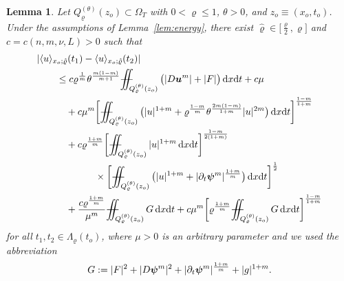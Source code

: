 \documentclass[a4paper, 10pt, american]{amsart}
\newtheorem{lemma}[theorem]{Lemma}
\numberwithin{theorem}{section}
\numberwithin{equation}{section}
\newcommand{\dxdt}{\,\mathrm{d}x\mathrm{d}t}
\renewcommand{\rho}{\varrho}
\newcommand{\power}[2]{\bm{#1^{\mbox{\unboldmath{\scriptsize$#2$}}}}}
\def\Xiint#1{\mathchoice
    {\XXiint\displaystyle\textstyle{#1}}%
    {\XXiint\textstyle\scriptstyle{#1}}%
    {\XXiint\scriptstyle\scriptscriptstyle{#1}}%
    {\XXiint\scriptscriptstyle\scriptscriptstyle{#1}}%
    \!\iint}
\def\XXiint#1#2#3{\setbox0=\hbox{$#1{#2#3}{\iint}$}
    \vcenter{\hbox{$#2#3$}}\kern-0.5\wd0}
\def\biint{\Xiint{-\!-}}
\def\<{\langle}
\def\>{\rangle}
\begin{document}
\begin{lemma}\label{lem:time-diff}
  Let $Q_{\rho}^{(\theta)}(z_o)\subset\Omega_T$ with 
$0<\rho\le 1$, $\theta>0$, and $z_o\equiv(x_o,t_o)$. 
Under the assumptions of Lemma~\ref{lem:energy}, there exist $\hat{\rho}\in\big[\frac\rho2,\rho\big]$ and $c=c(n,m,\nu,L)>0$ such that
\begin{align}\label{gluing}\nonumber
&|\<u\>_{x_o;\hat{\rho}}(t_1)-\<u\>_{x_o;\hat{\rho}}(t_2)|\\\nonumber
&\qquad\le
c\rho^{\frac1m}\theta^{\frac{m(1-m)}{m+1}}\biint_{Q_\rho^{(\theta)}(z_o)}
\big(|D\power um|+|F|\big)\dxdt+c\mu \\\nonumber
&\qquad\quad+
c\mu^m\bigg[\biint_{Q_\rho^{(\theta)}(z_o)} \big(|u|^{1+m} 
+
\rho^{\frac{1-m}m}\theta^{\frac{2m(1-m)}{1+m}} |u|^{2m}\big)
\dxdt\bigg]^{\frac{1-m}{1+m}}\\\nonumber
&\qquad\quad+
c\rho^{\frac{1+m}m}\bigg[\biint_{Q_\rho^{(\theta)}(z_o)} |u|^{1+m} \dxdt \bigg]^{\frac{1-m}{2(1+m)}} \\\nonumber
&\qquad\qquad\qquad\times
\bigg[\biint_{Q_\rho^{(\theta)}(z_o)}\big(|u|^{1+m}+ |\partial_t \power \psi m|^{\frac{1+m}m}\big) \dxdt\bigg]^{\frac12} \\
&\qquad\quad+
  \frac{c\rho^{\frac{1+m}m}}{\mu^m}
  \biint_{Q_\rho^{(\theta)}(z_o)} G \dxdt
+
c\mu^m\bigg[\rho^{\frac{1+m}m}\biint_{Q_{\rho}^{(\theta)}(z_o)}
G \dxdt\bigg]^{\frac{1-m}{1+m}}
\end{align}
for all $t_1,t_2\in\Lambda_\rho(t_o)$,
where $\mu>0$ is an arbitrary parameter
and we used the abbreviation
\begin{equation}\label{def-G-2}
  G:=|F|^2+|D\power\psi m|^2+|\partial_t\power\psi m|^{\frac{1+m}m}+|g|^{1+m}.
\end{equation}
\end{lemma}
\end{document}
